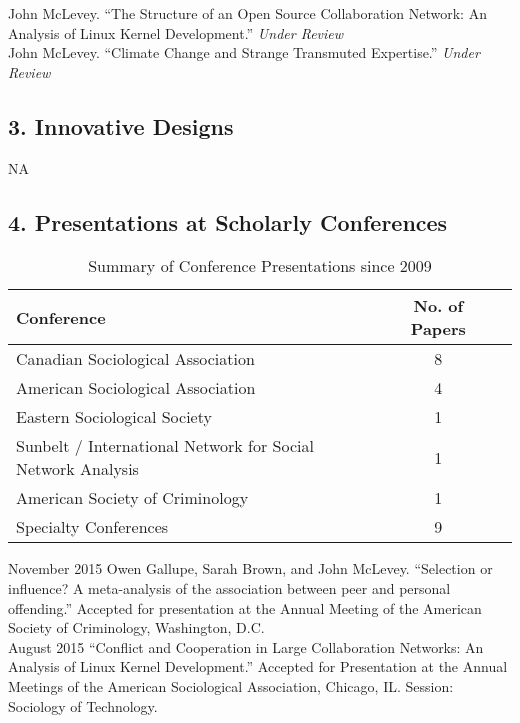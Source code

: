 \documentclass[9pt,usenames,dvipsnames]{article}
\begin{document}
\ind John McLevey. ``The Structure of an Open Source Collaboration Network: An Analysis of Linux Kernel Development.'' \emph{Under Review} \\ %

\ind John McLevey. ``Climate Change and Strange Transmuted Expertise.'' \emph{Under Review} %

\subsection*{3. Innovative Designs}

NA

\subsection*{4. Presentations at Scholarly Conferences}

\begin{table}[h!]
\caption{Summary of Conference Presentations since 2009}\centering
\begin{tabular}{lcc} 
\hline                          
Conference & No. of Papers \\ 
\hline 
Canadian Sociological Association & 8 \\
American Sociological Association & 4 \\
Eastern Sociological Society & 1 \\
Sunbelt / International Network for Social Network Analysis & 1 \\
American Society of Criminology & 1 \\
Specialty Conferences & 9 \\
\hline
\end{tabular}
\end{table}

\smallskip

\ind November 2015 Owen Gallupe, Sarah Brown, and John McLevey. ``Selection or influence? A meta-analysis of the association between peer and personal offending.'' Accepted for presentation at the Annual Meeting of the American Society of Criminology, Washington, D.C.\\

\ind August 2015 ``Conflict and Cooperation in Large Collaboration Networks: An Analysis of Linux Kernel Development.'' Accepted for Presentation at the Annual Meetings of the American Sociological Association, Chicago, IL. Session: Sociology of Technology. \\
\end{document}
